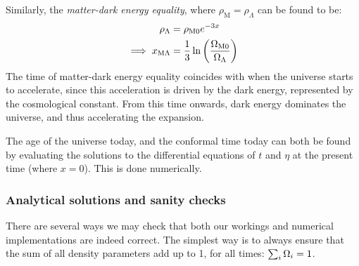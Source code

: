      Similarly, the \textit{matter-dark energy equality}, where $\rho_\mathrm{M}=\rho_\Lambda$ can be found to be:
     \begin{equation}\label{eq:m1:theory:equalities:matter_dark_energy}
        \begin{split}
            \rho_\Lambda &= \rho_\mathrm{M0}e^{-3x} \\
            \implies x_{\mathrm{M}\Lambda} &= \frac{1}{3}\ln\left(\frac{\Omega_\mathrm{M0}}{\Omega_\Lambda}\right)
        \end{split}
     \end{equation}
     The time of matter-dark energy equality coincides with when the universe starts to accelerate, since this acceleration is driven by the dark energy, represented by the cosmological constant. From this time onwards, dark energy dominates the universe, and thus accelerating the expansion. 

     The age of the universe today, and the conformal time today can both be found by evaluating the solutions to the differential equations of $t$ and $\eta$ at the present time (where $x=0$). This is done numerically. 

\subsubsection{Analytical solutions and sanity checks}\label{sec:m1:theory:sanity}
    There are several ways we may check that both our workings and numerical implementations are indeed correct. The simplest way is to always ensure that the sum of all density parameters add up to 1, for all times: $\sum_i\Omega_i=1$. 
    
